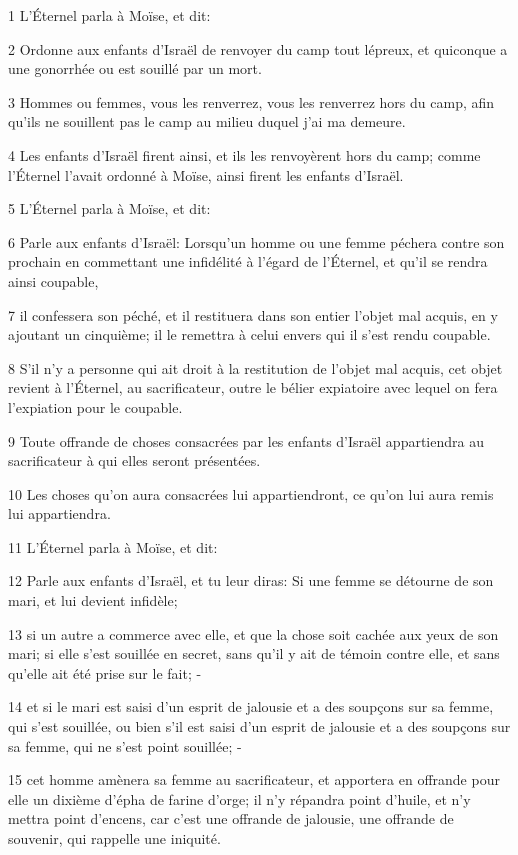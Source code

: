 \par 1 L'Éternel parla à Moïse, et dit:
\par 2 Ordonne aux enfants d'Israël de renvoyer du camp tout lépreux, et quiconque a une gonorrhée ou est souillé par un mort.
\par 3 Hommes ou femmes, vous les renverrez, vous les renverrez hors du camp, afin qu'ils ne souillent pas le camp au milieu duquel j'ai ma demeure.
\par 4 Les enfants d'Israël firent ainsi, et ils les renvoyèrent hors du camp; comme l'Éternel l'avait ordonné à Moïse, ainsi firent les enfants d'Israël.
\par 5 L'Éternel parla à Moïse, et dit:
\par 6 Parle aux enfants d'Israël: Lorsqu'un homme ou une femme péchera contre son prochain en commettant une infidélité à l'égard de l'Éternel, et qu'il se rendra ainsi coupable,
\par 7 il confessera son péché, et il restituera dans son entier l'objet mal acquis, en y ajoutant un cinquième; il le remettra à celui envers qui il s'est rendu coupable.
\par 8 S'il n'y a personne qui ait droit à la restitution de l'objet mal acquis, cet objet revient à l'Éternel, au sacrificateur, outre le bélier expiatoire avec lequel on fera l'expiation pour le coupable.
\par 9 Toute offrande de choses consacrées par les enfants d'Israël appartiendra au sacrificateur à qui elles seront présentées.
\par 10 Les choses qu'on aura consacrées lui appartiendront, ce qu'on lui aura remis lui appartiendra.
\par 11 L'Éternel parla à Moïse, et dit:
\par 12 Parle aux enfants d'Israël, et tu leur diras: Si une femme se détourne de son mari, et lui devient infidèle;
\par 13 si un autre a commerce avec elle, et que la chose soit cachée aux yeux de son mari; si elle s'est souillée en secret, sans qu'il y ait de témoin contre elle, et sans qu'elle ait été prise sur le fait; -
\par 14 et si le mari est saisi d'un esprit de jalousie et a des soupçons sur sa femme, qui s'est souillée, ou bien s'il est saisi d'un esprit de jalousie et a des soupçons sur sa femme, qui ne s'est point souillée; -
\par 15 cet homme amènera sa femme au sacrificateur, et apportera en offrande pour elle un dixième d'épha de farine d'orge; il n'y répandra point d'huile, et n'y mettra point d'encens, car c'est une offrande de jalousie, une offrande de souvenir, qui rappelle une iniquité.
